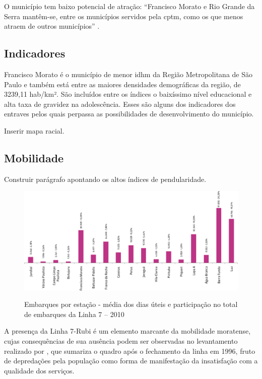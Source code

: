 	O município tem baixo potencial de atração: ``Francisco Morato e Rio Grande da Serra mantêm-se,
	entre os municípios servidos pela \gls{cptm}, como os que menos atraem de outros municípios'' \cite[p.80]{ferreira2010a}.
	
	\subsection{Indicadores}
	
	Francisco Morato é o município de menor \gls{idhm} da Região Metropolitana de São Paulo e também está entre as maiores densidades demográficas da região, de 3239,11 hab/km². São incluídos entre os índices o baixíssimo nível educacional e alta taxa de gravidez na adolescência. Esses são alguns dos indicadores dos entraves pelos quais perpassa as possibilidades de desenvolvimento do município.
	
	Inserir mapa racial.
	
	\subsection{Mobilidade} \label{Mobilidade}
	
	Construir parágrafo apontando os altos índices de pendularidade.
	
	\begin{figure}[!htb]
		\centering
		\caption[Embarques por estação da Linha 7 - 2010]{Embarques por estação - média dos dias úteis e participação no total de embarques da Linha 7 – 2010}
		\includegraphics[width=\linewidth]{img/pdcptm_57a}
		\label{fig:pdcptm_57a}
	\end{figure}
    
    A presença da Linha 7-Rubi é um elemento marcante da mobilidade moratense, cujas consequências de sua ausência podem ser observadas no levantamento realizado por \cite[p.32-33]{ferreira2010a}, que sumariza o quadro após o fechamento da linha em 1996, fruto de depredações pela população como forma de manifestação da insatisfação com a qualidade dos serviços.
    
